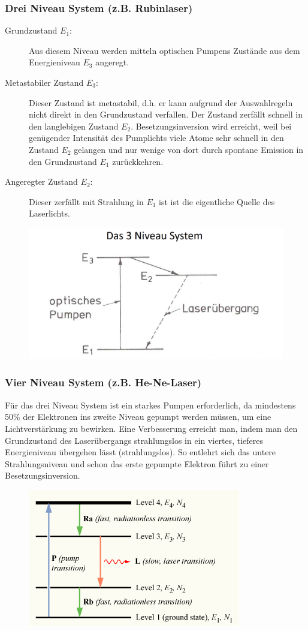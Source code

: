 \documentclass[twocolumn]{summery_4.1}
\begin{document}
\subsubsection{Drei Niveau System (z.B. Rubinlaser)}
\begin{description}
    \item[Grundzustand \(E_1\):] Aus diesem Niveau werden mitteln optischen Pumpens Zustände aus dem Energieniveau \(E_3\) angeregt.
    \item[Metastabiler Zustand \(E_3\):] Dieser Zustand ist metastabil, d.h. er kann aufgrund der Auswahlregeln nicht direkt in den Grundzustand verfallen. Der Zustand zerfällt schnell in den langlebigen Zustand \(E_2\). Besetzungsinversion wird erreicht, weil bei genügender Intensität des Pumplichts viele Atome sehr schnell in den Zustand $E_2$ gelangen und nur wenige von dort durch spontane Emission in den Grundzustand $E_1$ zurückkehren. 
    \item[Angeregter Zustand \(E_2\):] Dieser zerfällt mit Strahlung in \(E_1\) ist ist die eigentliche Quelle des Laserlichts.   
\end{description}
\begin{figure}[H]
    \centering
    \includegraphics[width=.49\textwidth]{3_Niveau_Laser.png}
\end{figure}


\subsubsection{Vier Niveau System (z.B. He-Ne-Laser)}
Für das drei Niveau System ist ein starkes Pumpen erforderlich, da mindestens 50\(\%\) der Elektronen ins zweite Niveau gepumpt werden müssen, um eine Lichtverstärkung zu bewirken. Eine Verbesserung erreicht man, indem man den Grundzustand des Laserübergangs strahlungslos in ein viertes, tieferes Energieniveau übergehen lässt (strahlungslos). So entlehrt sich das untere Strahlungsniveau und schon das erste gepumpte Elektron führt zu einer Besetzungsinversion.
\begin{figure}[H]
    \centering
    \includegraphics[width=.49\textwidth]{Population-inversion-4level.png}
\end{figure}
\end{document}
